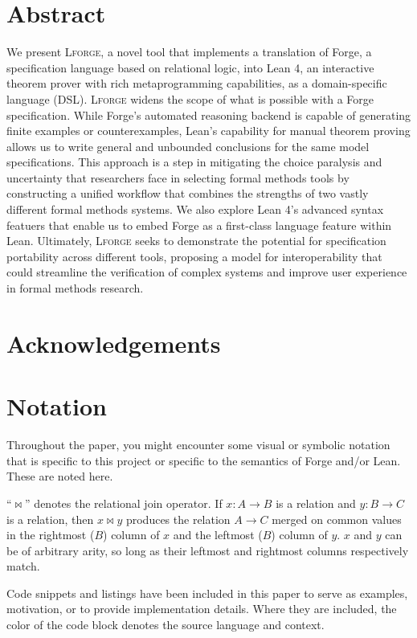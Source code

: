 \newpage
\section*{Abstract}

We present \textsc{Lforge}, a novel tool that implements a translation of Forge, a specification language based on relational logic, into Lean 4, an interactive theorem prover with rich metaprogramming capabilities, as a domain-specific language (DSL). \textsc{Lforge} widens the scope of what is possible with a Forge specification. While Forge's automated reasoning backend is capable of generating finite examples or counterexamples, Lean's capability for manual theorem proving allows us to write general and unbounded conclusions for the same model specifications. This approach is a step in mitigating the choice paralysis and uncertainty that researchers face in selecting formal methods tools by constructing a unified workflow that combines the strengths of two vastly different formal methods systems. We also explore Lean 4's advanced syntax featuers that enable us to embed Forge as a first-class language feature within Lean. Ultimately, \textsc{Lforge} seeks to demonstrate the potential for specification portability across different tools, proposing a model for interoperability that could streamline the verification of complex systems and improve user experience in formal methods research. 

\newpage
\section*{Acknowledgements}

\newpage
\section*{Notation}
Throughout the paper, you might encounter some visual or symbolic notation that is specific to this project or specific to the semantics of Forge and/or Lean. These are noted here. 

``$\bowtie$'' denotes the relational join operator. If $x: A \to B$ is a relation and $y: B \to C$ is a relation, then $x\bowtie y$ produces the relation $A\to C$ merged on common values in the rightmost ($B$) column of $x$ and the leftmost ($B$) column of $y$. $x$ and $y$ can be of arbitrary arity, so long as their leftmost and rightmost columns respectively match. 

Code snippets and listings have been included in this paper to serve as examples, motivation, or to provide implementation details. Where they are included, the color of the code block denotes the source language and context. 

